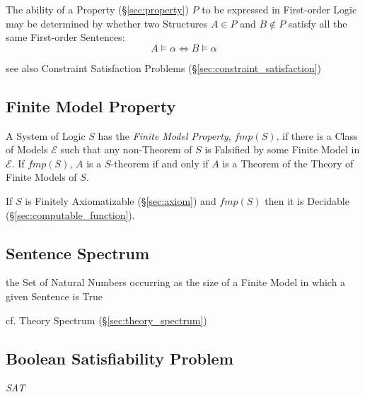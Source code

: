 The ability of a Property (\S\ref{sec:property}) $P$ to be expressed
in First-order Logic may be determined by whether two Structures $A
\in P$ and $B \notin P$ satisfy all the same First-order Sentences:
\[
  A \models \alpha \Leftrightarrow B \models \alpha
\]

\fist see also Constraint Satisfaction Problems
(\S\ref{sec:constraint_satisfaction})



\subsection{Finite Model Property}\label{sec:finite_model_property}

A System of Logic $S$ has the \emph{Finite Model Property}, $fmp(S)$,
if there is a Class of Models $\mathcal{E}$ such that any non-Theorem
of $S$ is Falsified by some Finite Model in $\mathcal{E}$. If
$fmp(S)$, $A$ is a $S$-theorem if and only if $A$ is a Theorem of the
Theory of Finite Models of $S$.

If $S$ is Finitely Axiomatizable (\S\ref{sec:axiom}) and $fmp(S)$ then
it is Decidable (\S\ref{sec:computable_function}).



\subsection{Sentence Spectrum}\label{sec:sentence_spectrum}

the Set of Natural Numbers occurring as the size of a Finite Model in which a
given Sentence is True

cf. Theory Spectrum (\S\ref{sec:theory_spectrum})



\subsection{Boolean Satisfiability Problem}\label{sec:sat}

\emph{SAT}

